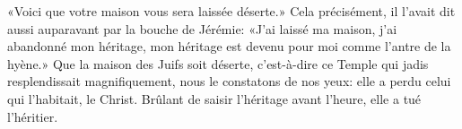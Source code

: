 «Voici que votre maison vous sera laissée déserte.»
Cela précisément, il l'avait dit aussi auparavant par la bouche de Jérémie:
	«J'ai laissé ma maison, j'ai abandonné mon héritage,
	mon héritage est devenu pour moi comme l'antre de la hyène.»
Que la maison des Juifs soit déserte,
	c'est-à-dire ce Temple qui jadis resplendissait magnifiquement,
	nous le constatons de nos yeux:
	elle a perdu celui qui l'habitait, le Christ.
Brûlant de saisir l'héritage avant l'heure, elle a tué l'héritier.

